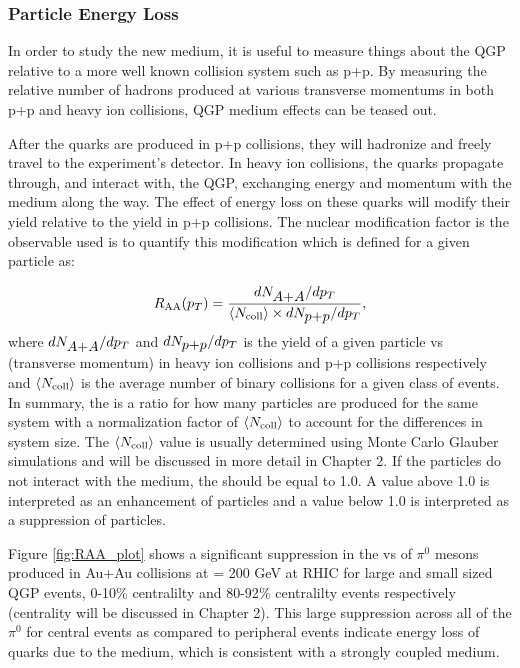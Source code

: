 \subsubsection{Particle Energy Loss}
In order to study the new medium, it is useful to measure things about the QGP relative to a more well known collision system such as p+p. By measuring the relative number of hadrons produced at various transverse momentums in both p+p and heavy ion collisions, QGP medium effects can be teased out.

After the quarks are produced in p+p collisions, they will hadronize and freely travel to the experiment's detector. In heavy ion collisions, the quarks propagate through, and interact
with, the QGP, exchanging energy and momentum with the medium along the way. The effect of energy loss on these quarks will modify their yield relative to the yield in p+p collisions. The nuclear modification factor \raa is the observable used is to quantify this modification which is defined for a given particle as:

\begin{equation}\label{eqn:raa}
 \mbox{$R_{\rm AA}$}(\mbox{$p_T$}) = \frac{dN_{\mbox{$A$+$A$}}/d\mbox{$p_T$}}{\left<\mbox{$N_{\rm coll}$}\right>\times dN_{\mbox{$p$+$p$}}/d\mbox{$p_T$}},
\end{equation}
where $dN_{\mbox{$A$+$A$}}/d\mbox{$p_T$}$ and $dN_{\mbox{$p$+$p$}}/d\mbox{$p_T$}$ is the yield of a given particle vs \pt (transverse momentum) in heavy ion collisions and p+p collisions respectively and $\left<\mbox{$N_{\rm coll}$}\right>$ is the average number of binary collisions for a given class of events. In summary, the \raa is a ratio for how many particles are produced for the same system with a normalization factor of $\left<\mbox{$N_{\rm coll}$}\right>$ to account for the differences in system size. The $\left<\mbox{$N_{\rm coll}$}\right>$ value is usually determined using Monte Carlo Glauber simulations and will be discussed in more detail in Chapter 2. If the particles do not interact with the medium, the \raa should be equal to 1.0. A value above 1.0 is interpreted as an enhancement of particles and a value below 1.0 is interpreted as a suppression of particles. 

Figure \ref{fig:RAA_plot} shows a significant suppression in the \raa vs \pt  of $\pi^0$ mesons produced in Au+Au collisions at \sqsn = 200 GeV at RHIC for large and small sized QGP events, 0-10$\%$ centralilty and 80-92$\%$ centralilty events respectively (centrality will be discussed in Chapter 2). This large suppression across all  \pt of the $\pi^0$ for central events as compared to peripheral events indicate energy loss of quarks due to the medium, which is consistent with a strongly coupled  medium.

